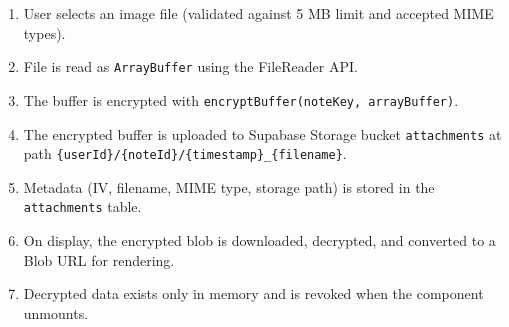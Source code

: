 \begin{enumerate}
    \item User selects an image file (validated against 5 MB limit and accepted MIME types).
    \item File is read as \texttt{ArrayBuffer} using the FileReader API.
    \item The buffer is encrypted with \texttt{encryptBuffer(noteKey, arrayBuffer)}.
    \item The encrypted buffer is uploaded to Supabase Storage bucket \texttt{attachments} at path \texttt{\{userId\}/\{noteId\}/\{timestamp\}\_\{filename\}}.
    \item Metadata (IV, filename, MIME type, storage path) is stored in the \texttt{attachments} table.
    \item On display, the encrypted blob is downloaded, decrypted, and converted to a Blob URL for rendering.
    \item Decrypted data exists only in memory and is revoked when the component unmounts.
\end{enumerate}


